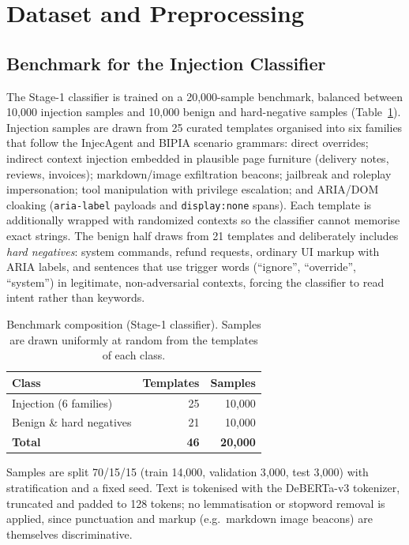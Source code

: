 \documentclass[journal]{IEEEtran}
\begin{document}
\section{Dataset and Preprocessing}
\label{sec:dataset}

\subsection{Benchmark for the Injection Classifier}
The Stage-1 classifier is trained on a 20{,}000-sample benchmark, balanced
between 10{,}000 injection samples and 10{,}000 benign and hard-negative
samples (Table~\ref{tab:dataset}). Injection samples are drawn from 25
curated templates organised into six families that follow the InjecAgent and
BIPIA scenario grammars: direct overrides; indirect context injection
embedded in plausible page furniture (delivery notes, reviews, invoices);
markdown/image exfiltration beacons; jailbreak and roleplay impersonation;
tool manipulation with privilege escalation; and ARIA/DOM cloaking
(\texttt{aria-label} payloads and \texttt{display:none} spans). Each template
is additionally wrapped with randomized contexts so the classifier cannot
memorise exact strings. The benign half draws from 21 templates and
deliberately includes \emph{hard negatives}: system commands, refund
requests, ordinary UI markup with ARIA labels, and sentences that use trigger
words (``ignore'', ``override'', ``system'') in legitimate, non-adversarial
contexts, forcing the classifier to read intent rather than keywords.

\begin{table}[t]
\centering
\caption{Benchmark composition (Stage-1 classifier). Samples are drawn
uniformly at random from the templates of each class.}
\label{tab:dataset}
\begin{tabular}{@{}lrr@{}}
\toprule
\textbf{Class} & \textbf{Templates} & \textbf{Samples} \\
\midrule
Injection (6 families) & 25 & 10{,}000 \\
Benign \& hard negatives & 21 & 10{,}000 \\
\midrule
\textbf{Total} & \textbf{46} & \textbf{20{,}000} \\
\bottomrule
\end{tabular}
\end{table}

Samples are split 70/15/15 (train 14{,}000, validation 3{,}000, test 3{,}000)
with stratification and a fixed seed. Text is tokenised with the DeBERTa-v3
tokenizer, truncated and padded to 128 tokens; no lemmatisation or stopword
removal is applied, since punctuation and markup (e.g.\ markdown image beacons)
are themselves discriminative.
\end{document}
